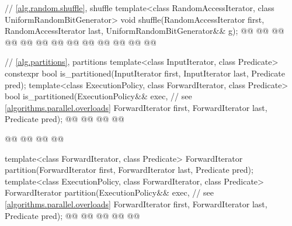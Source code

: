 \begin{codeblock}
{  // \ref{alg.random.shuffle}, shuffle
  template<class RandomAccessIterator, class UniformRandomBitGenerator>
    void shuffle(RandomAccessIterator first,
                 RandomAccessIterator last,
                 UniformRandomBitGenerator&& g);
  @@
    @@
      @@
        @@
        @@
      @@
    @@
      @@
        @@
        @@
      @@
        @@
  @\added{\}}@

  // \ref{alg.partitions}, partitions
  template<class InputIterator, class Predicate>
    constexpr bool is_partitioned(InputIterator first, InputIterator last, Predicate pred);
  template<class ExecutionPolicy, class ForwardIterator, class Predicate>
    bool is_partitioned(ExecutionPolicy&& exec, // see \ref{algorithms.parallel.overloads}
                        ForwardIterator first, ForwardIterator last, Predicate pred);
  @@
    @@
        @@
      @@

    @@
        @@
      @@
  @\added{\}}@

  template<class ForwardIterator, class Predicate>
    ForwardIterator partition(ForwardIterator first,
                              ForwardIterator last,
                              Predicate pred);
  template<class ExecutionPolicy, class ForwardIterator, class Predicate>
    ForwardIterator partition(ExecutionPolicy&& exec, // see \ref{algorithms.parallel.overloads}
                              ForwardIterator first,
                              ForwardIterator last,
                              Predicate pred);
  @@
    @@
        @@
      @@
      @@

}
\end{codeblock}
